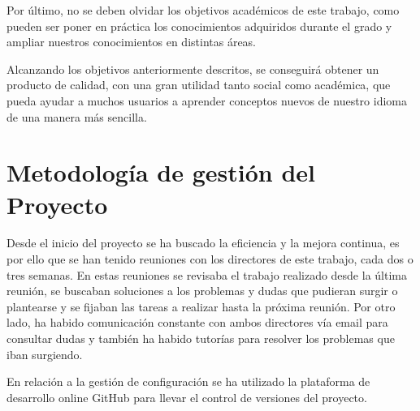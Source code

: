 Por último, no se deben olvidar los objetivos académicos de este trabajo, como pueden ser poner en práctica los conocimientos adquiridos durante el grado y ampliar nuestros conocimientos en distintas áreas. 

Alcanzando los objetivos anteriormente descritos, se conseguirá obtener un producto de calidad, con una gran utilidad tanto social como académica, que pueda ayudar a muchos usuarios a aprender conceptos nuevos de nuestro idioma de una manera más sencilla.
	
\section{Metodología de gestión del Proyecto}
\label{cap:sec:gestionProyecto}

Desde el inicio del proyecto se ha buscado la eficiencia y la mejora continua, es por ello que se han tenido reuniones con los directores de este trabajo, cada dos o tres semanas. En estas reuniones se revisaba el trabajo realizado desde la última reunión, se buscaban soluciones a los problemas y dudas que pudieran surgir o plantearse y se fijaban las tareas a realizar hasta la próxima reunión.
Por otro lado, ha habido comunicación constante con ambos directores vía email para consultar dudas y también ha habido tutorías para resolver los problemas que iban surgiendo. 

En relación a la gestión de configuración se ha utilizado la plataforma de desarrollo online GitHub para llevar el control de versiones del proyecto.

